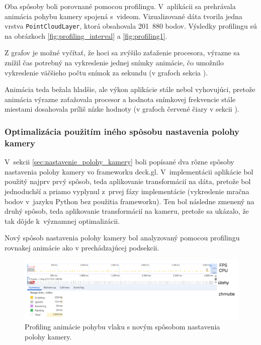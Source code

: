 Oba spôsoby boli porovnané pomocou profilingu. V~aplikácii sa prehrávala animácia pohybu kamery spojená s~videom. Vizualizované dáta tvorila jedna vrstva \texttt{PointCloudLayer}, ktorá obsahovala 201~880 bodov. Výsledky profilingu sú na obrázkoch \ref{fig:profiling_interval} a \ref{fig:profiling1}.

Z grafov je možné vyčítať, že hoci sa zvýšilo zaťaženie procesora, výrazne sa znížil čas potrebný na vykreslenie jednej snímky animácie, čo umožnilo vykreslenie väčšieho počtu snímok za sekundu (v grafoch sekcia ).

Animácia teda bežala hladšie, ale výkon aplikácie stále nebol vyhovujúci, pretože animácia výrazne zaťažovala procesor a hodnota snímkovej frekvencie stále miestami dosahovala príliš nízke hodnoty (v grafoch červené čiary v sekcii ).

\subsubsection{Optimalizácia použitím iného spôsobu nastavenia polohy kamery}

V~sekcii \ref{sec:nastavenie_polohy_kamery} boli popísané dva rôzne spôsoby nastavenia polohy kamery vo frameworku deck.gl. V~implementácii aplikácie bol použitý najprv prvý spôsob, teda aplikovanie transformácií na dáta, pretože bol jednoduchší a priamo vyplynul z~prvej fázy implementácie (vykreslenie mračna bodov v~jazyku Python bez použitia frameworku). Ten bol následne zmenený na druhý spôsob, teda aplikovanie transformácií na kameru, pretože sa ukázalo, že tak dôjde k~významnej optimalizácii.

Nový spôsob nastavenia polohy kamery bol analyzovaný pomocou profilingu rovnakej animácie ako v prechádzajúcej podsekcii.

\begin{figure}[h!]
    \centering
    \includegraphics[width=1\linewidth]{text_prace/obrazky-figures/profiling2.pdf}
    \caption{Profiling animácie pohybu vlaku s novým spôsobom nastavenia polohy kamery.}
    \label{fig:profiling2}
\end{figure}

